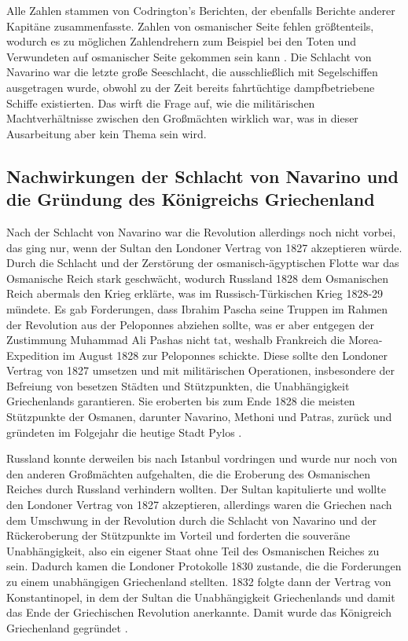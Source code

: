 \documentclass[preprint]{geomorphica} %
\begin{document}
Alle Zahlen stammen von Codrington's Berichten, der ebenfalls Berichte anderer Kapitäne zusammenfasste.
Zahlen von osmanischer Seite fehlen größtenteils, wodurch es zu möglichen Zahlendrehern zum Beispiel bei den Toten und Verwundeten auf osmanischer Seite gekommen sein kann \cite{James1837}.
Die Schlacht von Navarino war die letzte große Seeschlacht, die ausschließlich mit Segelschiffen ausgetragen wurde, obwohl zu der Zeit bereits fahrtüchtige dampfbetriebene Schiffe existierten.
Das wirft die Frage auf, wie die militärischen Machtverhältnisse zwischen den Großmächten wirklich war, was in dieser Ausarbeitung aber kein Thema sein wird. 

\subsection{Nachwirkungen der Schlacht von Navarino und die Gründung des Königreichs Griechenland}

Nach der Schlacht von Navarino war die Revolution allerdings noch nicht vorbei, das ging nur, wenn der Sultan den Londoner Vertrag  von 1827 akzeptieren würde.
Durch die Schlacht und der Zerstörung der osmanisch-ägyptischen Flotte war das Osmanische Reich stark geschwächt, wodurch Russland 1828 dem Osmanischen Reich abermals den Krieg erklärte, was im Russisch-Türkischen Krieg 1828-29 mündete.
Es gab Forderungen, dass Ibrahim Pascha seine Truppen im Rahmen der Revolution aus der Peloponnes abziehen sollte, was er aber entgegen der Zustimmung Muhammad Ali Pashas nicht tat, weshalb Frankreich die Morea-Expedition im August 1828 zur Peloponnes schickte.
Diese sollte den Londoner Vertrag von 1827 umsetzen und mit militärischen Operationen, insbesondere der Befreiung von besetzen Städten und Stützpunkten, die Unabhängigkeit Griechenlands garantieren.
Sie eroberten bis zum Ende 1828 die meisten Stützpunkte der Osmanen, darunter Navarino, Methoni und Patras, zurück und gründeten im Folgejahr die heutige Stadt Pylos \cite{Anderson1966, Dakin1973, Woodhouse1965}.

Russland konnte derweilen bis nach Istanbul vordringen und wurde nur noch von den anderen Großmächten aufgehalten, die die Eroberung des Osmanischen Reiches durch Russland verhindern wollten.
Der Sultan kapitulierte und wollte den Londoner Vertrag von 1827 akzeptieren, allerdings waren die Griechen nach dem Umschwung in der Revolution durch die Schlacht von Navarino und der Rückeroberung der Stützpunkte im Vorteil und forderten die souveräne Unabhängigkeit, also ein eigener Staat ohne Teil des Osmanischen Reiches zu sein.
Dadurch kamen die Londoner Protokolle 1830 zustande, die die Forderungen zu einem unabhängigen Griechenland stellten.
1832 folgte dann der Vertrag von Konstantinopel, in dem der Sultan die Unabhängigkeit Griechenlands und damit das Ende der Griechischen Revolution anerkannte.
Damit wurde das Königreich Griechenland gegründet \cite{Zelepos2015, Dakin1973, Clair2008, Woodhouse1965}.
\end{document}
